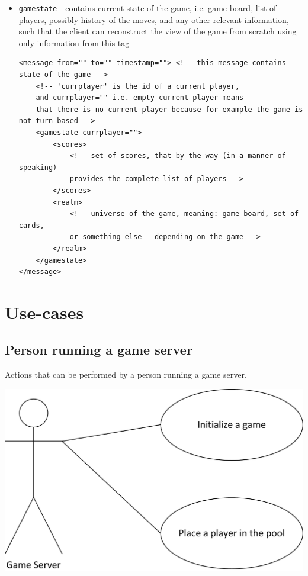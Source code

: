 \documentclass{article}
\begin{document}
\begin{itemize}
  \item \verb|gamestate| - contains current state of the game, i.e. game board, list of players, possibly 
  history of the moves, and any other relevant information, such that the client can reconstruct the view 
  of the game from scratch using only information from this tag
\begin{verbatim}
<message from="" to="" timestamp=""> <!-- this message contains state of the game -->
	<!-- 'currplayer' is the id of a current player, 
	and currplayer="" i.e. empty current player means 
	that there is no current player because for example the game is not turn based -->
	<gamestate currplayer="">
		<scores>
			<!-- set of scores, that by the way (in a manner of speaking) 
			provides the complete list of players -->
		</scores>
		<realm>
			<!-- universe of the game, meaning: game board, set of cards, 
			or something else - depending on the game -->
		</realm>
	</gamestate>
</message>
\end{verbatim}
\end{itemize}





\section{Use-cases}

\subsection{Person running a game server}
Actions that can be performed by a person running a game server.

\includegraphics[scale=1.00]{UGS_usecases_gameserver.jpg}
\end{document}
